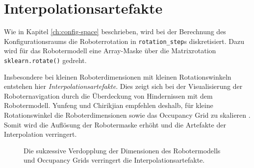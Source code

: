 \section{Interpolationsartefakte}

Wie in Kapitel \ref{ch:config-space} beschrieben, wird bei der Berechnung des Konfigurationsraums die Roboterrotation in \texttt{rotation\_step}s diskretisiert. Dazu wird für das Robotermodell eine Array-Maske über die Matrixrotation \texttt{sklearn.rotate()} gedreht. 

Insbesondere bei kleinen Roboterdimensionen mit kleinen Rotationswinkeln entstehen hier \textit{Interpolationsartefakte}.
Dies zeigt sich bei der Visualisierung der Roboternavigation durch die Überdeckung von Hindernissen mit dem Robotermodell. Yunfeng und Chirikjian empfehlen deshalb, für kleine Rotationswinkel die Roboterdimensionen sowie das Occupancy Grid zu skalieren \cite{yujiang.2017}.
Somit wird die Auflösung der Robotermaske erhöht und die Artefakte der Interpolation verringert.
\vspace*{0.5cm}
\begin{figure}[h!]
	\footnotesize
	\centering
	\hspace*{-0.075\linewidth}
	\centerline{}
	\hspace*{-0.075\linewidth}
	\caption{Die sukzessive Verdopplung der Dimensionen des Robotermodells und Occupancy Grids verringert die Interpolationsartefakte.}
\end{figure}







